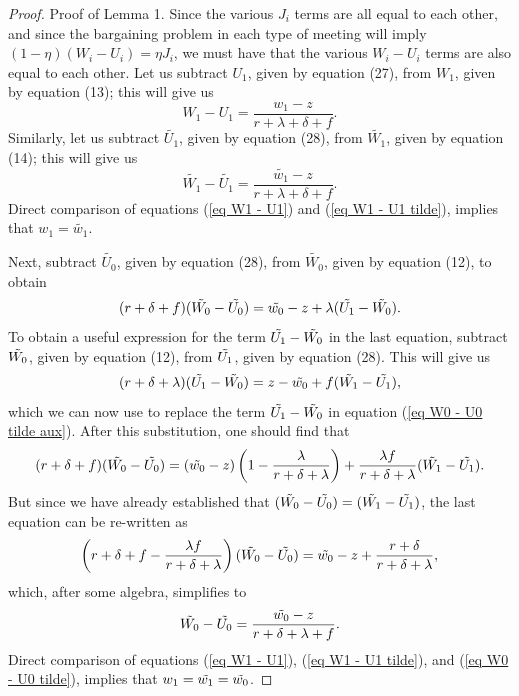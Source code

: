 \documentclass[12pt]{article} %
\theoremstyle{definition}
\begin{document}
\begin{proof}{Proof of Lemma 1.}
Since the various $J_i$ terms are all equal to each other, and since the bargaining problem in each type of meeting will imply $(1-\eta)(W_i-U_i)=\eta J_i$, we must have that the various $W_i-U_i$ terms are also equal to each other. Let us subtract $U_1$, given by equation (27),
from $W_1$, given by equation (13);
this will give us 
\begin{equation}
W_1-U_1=\frac{w_1-z}{r+\lambda+\delta+f}. \label{eq W1 - U1}
\end{equation}Similarly, let us subtract $\tilde{U_1}$, given by equation (28),
from $\tilde{W_1}$, given by equation (14); %
this will give us 
\begin{equation}
\tilde{W_1}-\tilde{U_1}=\frac{\tilde{w_1}-z}{r+\lambda+\delta+f}. \label{eq W1 - U1 tilde} 
\end{equation}Direct comparison of equations (\ref{eq W1 - U1}) and (\ref{eq W1 - U1 tilde}), implies that $w_1=\tilde{w_1}$. 

Next, subtract $\tilde{U_0}$, given by equation (28), 
from $\tilde{W_0}$, given by equation (12), 
to obtain 
\begin{equation}
 (r+\delta+f)(\Tilde{W_0}-\Tilde{U_0})=\Tilde{w_0}-z+\lambda(\Tilde{U_1}-\Tilde{W_0}). \label{eq W0 - U0 tilde aux}
\end{equation}To obtain a useful expression for the term $\Tilde{U_1}-\Tilde{W_0}$ in the last equation, subtract $\Tilde{W_0}$, given by equation (12), 
from $\Tilde{U_1}$, given by equation (28). 
This will give us   
\begin{equation}
(r+\delta+\lambda)(\Tilde{U_1}-\Tilde{W_0})=z-\Tilde{w_0}+f(\Tilde{W_1}-\Tilde{U_1}), \nonumber 
\end{equation}which we can now use to replace the term $\Tilde{U_1}-\Tilde{W_0}$ in equation (\ref{eq W0 - U0 tilde aux}). After this substitution, one should find that 
\begin{equation*}
(r+\delta+f)(\Tilde{W_0}-\Tilde{U_0})=(\Tilde{w_0}-z)\left(1-\frac{\lambda}{r+\delta+\lambda}\right) + \frac{\lambda f}{r+\delta+\lambda}(\Tilde{W_1}-\Tilde{U_1}).
\end{equation*}But since we have already established that $(\Tilde{W_0}-\Tilde{U_0})=(\Tilde{W_1}-\Tilde{U_1})$, the last equation can be re-written as 
\begin{equation*}
   \left(r+\delta+f-\frac{\lambda f}{r+\delta+\lambda}\right)(\Tilde{W_0}-\Tilde{U_0})=\Tilde{w_0}-z+\frac{r+\delta}{r+\delta+\lambda},  
\end{equation*}which, after some algebra, simplifies to  
\begin{equation}
      \Tilde{W_0}-\Tilde{U_0} = \frac{\Tilde{w_0}-z}{r+\delta+\lambda+f}.\label{eq W0 - U0 tilde}  
\end{equation}Direct comparison of equations (\ref{eq W1 - U1}), (\ref{eq W1 - U1 tilde}), and (\ref{eq W0 - U0 tilde}), implies that $w_1=\tilde{w_1}=\Tilde{w_0}$.


\end{proof}
\end{document}
